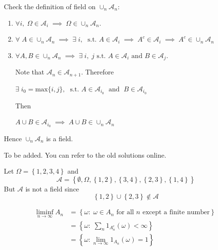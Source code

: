 \begin{list}{1.9.}{}
\item Check the definition of field on $\cup_n \mathcal{A}_n$:
  \begin{enumerate}
  \item $\forall i,\; \Omega \in \mathcal{A}_i
    \;\implies\;
    \Omega\in\cup_n\mathcal{A}_n$.
  \item $\forall\;A\in\cup_n\mathcal{A}_n
    \;\implies\;
    \exists\; i,\; \text{ s.t. } A \in \mathcal{A}_i
    \;\implies\;
    A^c\in\mathcal{A}_i
    \;\implies\;
    A^c\in\cup_n\mathcal{A}_n$
  \item $\forall A, B \in \cup_n\mathcal{A}_n \;\implies\; \exists\;i,\;j \text{ s.t. }A\in\mathcal{A}_i \text{ and }B\in\mathcal{A}_j$.
    \par
    Note that $\mathcal{A}_n \in \mathcal{A}_{n+1}$. Therefore
    \par
    $\exists\; i_0 = \mathrm{max}\{i, j\},\; \text{ s.t. }
    A\in\mathcal{A}_{i_0}\;\text{ and }\;B\in\mathcal{A}_{i_0} $
    \par
    Then
    \par
    $A \cup B \in \mathcal{A}_{i_0} \;\implies\; A \cup B \in \cup_n\mathcal{A}_n$
  \end{enumerate}
  Hence $\cup_n\mathcal{A}_n$ is a field.
  
\item {\color{red}To be added. You can refer to the old solutions online.}
  
\item Let $\Omega = \left\{1,2,3,4\right\}$ and
  \[
    \mathcal{A} = \left\{\emptyset, \Omega, \left\{1, 2\right\}, \left\{3,4\right\},
      \left\{2, 3\right\}, \left\{1, 4\right\}
    \right\}
  \]
  But $\mathcal{A}$ is not a field since
  \[
    \left\{1, 2\right\} \cup \left\{2, 3\right\} \notin \mathcal{A}
  \]
  
\item \[
    \begin{aligned}
      \underset{n\rightarrow\infty}{\mathrm{liminf}}\;A_n
      & = \left\{
        \omega:\; \omega\in A_n\text{ for all } n \text{ except a finite number}
      \right\}    \\
      & = \left\{\omega:\; \sum\limits_{n}1_{A_n^c}\left(\omega\right) < \infty \right\}    \\
      & = \left\{
        \omega:\; \underset{n\rightarrow\infty}{\mathrm{lim}}\;1_{A_n}\left(\omega\right) = 1
      \right\}
    \end{aligned}
  \]
  

\end{list}
